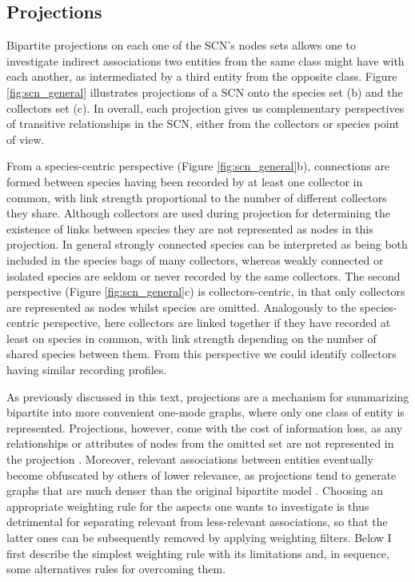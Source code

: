 \subsection{Projections}

Bipartite projections on each one of the SCN's nodes sets allows one to investigate indirect associations two entities from the same class might have with each another, as intermediated by a third entity from the opposite class. 
Figure \ref{fig:scn_general} illustrates projections of a SCN onto the species set (b) and the collectors set (c).
In overall, each projection gives us complementary perspectives of transitive relationships in the SCN, either from the collectors or species point of view.

From a species-centric perspective (Figure \ref{fig:scn_general}b), connections are formed between species having been recorded by at least one collector in common, with link strength proportional to the number of different collectors they share. 
Although collectors are used during projection for determining the existence of links between species they are not represented as nodes in this projection.
In general strongly connected species can be interpreted as being both included in the species bags of many collectors, whereas weakly connected or isolated species are seldom or never recorded by the same collectors.
The second perspective (Figure \ref{fig:scn_general}c) is collectors-centric, in that only collectors are represented as nodes whilst species are omitted. 
Analogously to the species-centric perspective, here collectors are linked together if they have recorded at least on species in common, with link strength depending on the number of shared species between them. 
From this perspective we could identify collectors having similar recording profiles.

As previously discussed in this text, projections are a mechanism for summarizing bipartite into more convenient one-mode graphs, where only one class of entity is represented. %
Projections, however, come with the cost of information loss, as any relationships or attributes of nodes from the omitted set are not represented in the projection \cite{Borgatti1997}. %
Moreover, relevant associations between entities eventually become obfuscated by others of lower relevance, as projections tend to generate graphs that are much denser than the original bipartite model \cite{Lambiotte2005}.
Choosing an appropriate weighting rule for the aspects one wants to investigate is thus detrimental for separating relevant from less-relevant associations, so that the latter ones can be subsequently removed by applying weighting filters.
Below I first describe the simplest weighting rule with its limitations and, in sequence, some alternatives rules for overcoming them.

